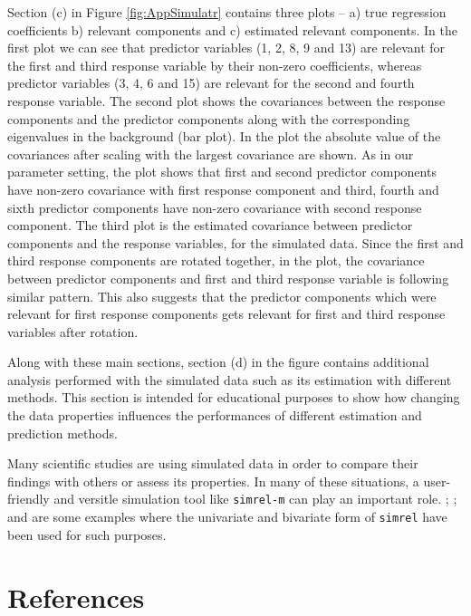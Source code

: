\documentclass[num-refs]{wiley-article}
\begin{document}
Section (c) in Figure \ref{fig:AppSimulatr} contains three plots -- a)
true regression coefficients b) relevant components and c) estimated
relevant components. In the first plot we can see that predictor
variables (1, 2, 8, 9 and 13) are relevant for the first and third
response variable by their non-zero coefficients, whereas predictor
variables (3, 4, 6 and 15) are relevant for the second and fourth
response variable. The second plot shows the covariances between the
response components and the predictor components along with the
corresponding eigenvalues in the background (bar plot). In the plot the
absolute value of the covariances after scaling with the largest
covariance are shown. As in our parameter setting, the plot shows that
first and second predictor components have non-zero covariance with
first response component and third, fourth and sixth predictor
components have non-zero covariance with second response component. The
third plot is the estimated covariance between predictor components and
the response variables, for the simulated data. Since the first and
third response components are rotated together, in the plot, the
covariance between predictor components and first and third response
variable is following similar pattern. This also suggests that the
predictor components which were relevant for first response components
gets relevant for first and third response variables after rotation.

Along with these main sections, section (d) in the figure contains
additional analysis performed with the simulated data such as its
estimation with different methods. This section is intended for
educational purposes to show how changing the data properties influences
the performances of different estimation and prediction methods.

Many scientific studies
\citep{helland2012near, saebo2008lpls, cook2015simultaneous} are using
simulated data in order to compare their findings with others or assess
its properties. In many of these situations, a user-friendly and
versitle simulation tool like \texttt{simrel-m} can play an important
role. \citet{gangsei2016theoretical}; \citet{gangsei2016linear}; and
\citet{saebo2015simrel} are some examples where the univariate and
bivariate form of \texttt{simrel} have been used for such purposes.

\section*{References}\label{references}
\end{document}
